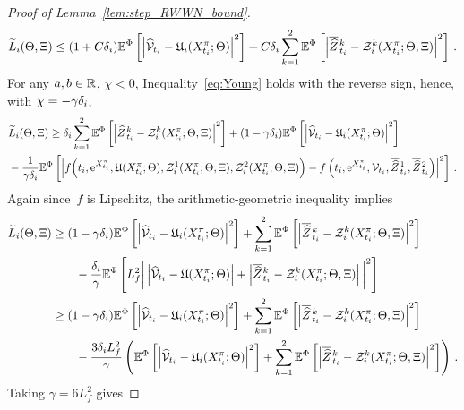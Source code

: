 \begin{proof}[Proof of Lemma~\ref{lem:step_RWWN_bound}]
    \begin{equation*}
        \widetilde{L}_i(\Theta, \Xi) \leq (1 + C\delta_{i} ) \mathbb{E}^\Phi\left[\left\lvert \widehat {\mathcal{V}}_{t_i} - \mathfrak{U}_i(X^\pi_{t_i}; \Theta)\right\rvert^2\right] + C\delta_{i} \sum_{k=1}^2\mathbb{E}^\Phi\left[ \left\lvert \overline{\widehat{Z}}\kern0.1em^{k}_{t_{i}} - \mathcal{Z}_i^k(X^\pi_{t_i}; \Theta, \Xi)\right\rvert^2\right]\,.
    \end{equation*}
    For any $a, b\in\mathbb{R}$, $\chi<0$, Inequality~\eqref{eq:Young} holds with the reverse sign, hence, with $\chi = -\gamma\delta_{i}$,
    \begin{align*}
        & \widetilde{L}_i(\Theta, \Xi) \geq \delta_{i} \sum_{k=1}^2\mathbb{E}^\Phi\left[ \left\lvert \overline{\widehat{Z}}\kern0.1em^{k}_{t_{i}} - \mathcal{Z}_i^k(X^\pi_{t_i}; \Theta, \Xi)\right\rvert^2\right] + (1 - \gamma\delta_{i} ) \mathbb{E}^\Phi\left[\left\lvert \widehat {\mathcal{V}}_{t_i} - \mathfrak{U}_i(X^\pi_{t_i}; \Theta)\right\rvert^2\right] \\
        & - \frac1{\gamma\delta_{i} }\mathbb{E}^\Phi\left[\left\lvert  f\Big(t_i, \mathrm{e}^{X^\pi_{t_i}}, \mathfrak{U}(X^\pi_{t_i}; \Theta), \mathcal{Z}^1_i(X^\pi_{t_i}; \Theta, \Xi), \mathcal{Z}^2_i(X^\pi_{t_i}; \Theta, \Xi)\Big) - f\left(t_i, \mathrm{e}^{X^\pi_{t_i}}, \mathcal{V}_{t_i}, \overline{\widehat{Z}}\kern0.1em^{1}_{t_{i}}, \overline{\widehat{Z}}\kern0.1em^{2}_{t_{i}}\right) \right\rvert^2\right]\,.
    \end{align*}
    Again since~$f$ is Lipschitz, the arithmetic-geometric inequality implies
    \begin{align*}
        \widetilde{L}_i(\Theta, \Xi) 
        &\geq (1 - \gamma\delta_{i} ) \mathbb{E}^\Phi\left[\left\lvert \widehat {\mathcal{V}}_{t_i} - \mathfrak{U}_i(X^\pi_{t_i}; \Theta)\right\rvert^2\right] + \sum_{k=1}^2\mathbb{E}^\Phi\left[ \left\lvert \overline{\widehat{Z}}\kern0.1em^{k}_{t_{i}} - \mathcal{Z}_i^k(X^\pi_{t_i}; \Theta, \Xi)\right\rvert^2\right]\\
        & \qquad - \frac{\delta_{i}}\gamma\mathbb{E}^\Phi\left[ L_f^2 \bigg\lvert \left\lvert \widehat{\mathcal{V}}_{t_i} - \mathfrak{U}(X^\pi_{t_i}; \Theta)\right\rvert  + \left\lvert \overline{\widehat{Z}}\kern0.1em^{k}_{t_{i}} - \mathcal{Z}_i^k(X^\pi_{t_i}; \Theta, \Xi)\right\rvert\bigg\rvert^2\right] \\ 
        &\geq (1 - \gamma\delta_{i} ) \mathbb{E}^\Phi\left[\left\lvert \widehat {\mathcal{V}}_{t_i} - \mathfrak{U}_i(X^\pi_{t_i}; \Theta)\right\rvert^2\right] + \sum_{k=1}^2\mathbb{E}^\Phi\left[ \left\lvert \overline{\widehat{Z}}\kern0.1em^{k}_{t_{i}} - \mathcal{Z}_i^k(X^\pi_{t_i}; \Theta, \Xi)\right\rvert^2\right]\\
        & \qquad - \frac{3\delta_{i}  L_f^2}{\gamma}\left( \mathbb{E}^\Phi\left[\left\lvert \widehat {\mathcal{V}}_{t_i} - \mathfrak{U}_i(X^\pi_{t_i}; \Theta)\right\rvert^2\right] + \sum_{k=1}^2\mathbb{E}^\Phi\left[ \left\lvert \overline{\widehat{Z}}\kern0.1em^{k}_{t_{i}} - \mathcal{Z}_i^k(X^\pi_{t_i}; \Theta, \Xi)\right\rvert^2\right] \right)\,.
    \end{align*}
    Taking $\gamma=6L_f^2$ gives

\end{proof}
